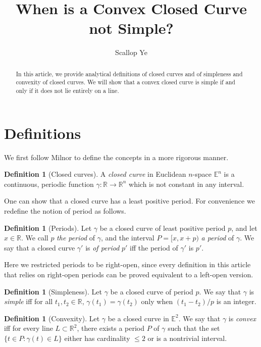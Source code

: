 \documentclass{amsart}
\title{When is a Convex Closed Curve not Simple?}
\author{Scallop Ye}
\theoremstyle{definition}
\newtheorem{definition}[proposition]{Definition}
\begin{document}
\begin{abstract}
    In this article, we provide analytical definitions of closed curves
    and of simpleness and convexity of closed curves. We will show
    that a convex closed curve is simple if and only if
    it does not lie entirely on a line.
\end{abstract}

\maketitle

\section{Definitions}

We first follow Milnor \cite{milnor} to define the concepts in a more rigorous manner.

\begin{definition}[Closed curves]
    A \emph{closed curve} in Euclidean $n$-space $\mathbb{E}^n$ is a
    continuous, periodic function $\gamma:\mathbb{R}\to\mathbb{R}^n$
    which is not constant in any interval.
\end{definition}

One can show that a closed curve has a least positive period.
For convenience we redefine the notion of period as follows.

\begin{definition}[Periods]
    Let $\gamma$ be a closed curve of least positive period $p$,
    and let $x\in\mathbb{R}$. We call $p$ \emph{the period} of $\gamma$,
    and the interval $P=[x,x+p)$ \emph{a period} of $\gamma$.
    We say that a closed curve $\gamma'$ is \emph{of period} $p'$
    iff the period of $\gamma'$ is $p'$.
\end{definition}

Here we restricted periods to be right-open, since every
definition in this article that relies on right-open periods can be
proved equivalent to a left-open version.

\begin{definition}[Simpleness]
    Let $\gamma$ be a closed curve of period $p$.
    We say that $\gamma$ is \emph{simple}
    iff for all $t_1,t_2\in\mathbb{R}$, $\gamma(t_1)=\gamma(t_2)$
    only when $(t_1-t_2)/p$ is an integer.
\end{definition}

\begin{definition}[Convexity]
    Let $\gamma$ be a closed curve in $\mathbb{E}^2$.
    We say that $\gamma$ is \emph{convex} iff
    for every line $L\subset\mathbb{R}^2$,
    there exists a period $P$ of $\gamma$ such that
    the set $\{t\in P:\gamma(t)\in L\}$ either
    has cardinality $\le2$ or is a nontrivial interval.
\end{definition}
\end{document}
